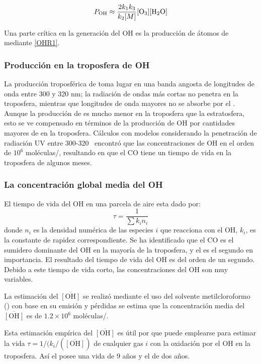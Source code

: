 \begin{equation}
P_\mathrm{OH} \approx  \frac{2k_1k_3}{ k_2[M] } [\ce{O3}]  [\ce{H2O}] 
\end{equation}

Una parte crítica en la generación del OH es la producción de átomos de    mediante \ref{OHR1}. 

\subsubsection{Producci\'on en la troposfera de OH}
La producción troposférica de  toma lugar en una  banda angosta de longitudes de onda entre 300 y 320 nm; la radiación de ondas más cortas no penetra en la troposfera, mientras que longitudes de onda mayores no se absorbe por el . Aunque la producción de  es mucho menor en la troposfera que la estratosfera, esto se ve compensado en términos de la producción de OH por cantidades mayores de  en la troposfera. Cálculos con modelos considerando la penetración de radiación UV entre 300-320 \nano\metre\,  encontró que las concentraciones de OH en el orden de $10^6$ moléculas/\cubic\metre, resultando en que el CO tiene un tiempo de vida en la troposfera de algunos meses.
\subsubsection{La concentraci\'on global media del OH}
El tiempo de vida del OH en una parcela de aire esta dado por:
\begin{equation*}
\tau=\frac{1}{\sum k_in_i}
\end{equation*}
donde $n_i$ es la densidad numérica de las especies $i$ que reacciona con el OH, $k_i$, es la constante de rapidez  correspondiente. Se ha identificado que el CO es el sumidero dominante del OH en la mayoría de la troposfera, y el  es el segundo en importancia. El resultado del tiempo de vida del OH es del orden de un segundo. Debido a este tiempo de vida corto, las concentraciones del OH son muy variables.

La estimación del  $\overline{[\mathrm{OH}]}$ se realizó mediante el uso del solvente metilcloroformo () con base en su emisión y pérdidas se estima que la concentración media del  $\overline{[\mathrm{OH}]}$ es de $1.2\times10^6$ moléculas/\centi\cubic\metre.

Esta estimación empírica del   $\overline{[\mathrm{OH}]}$ es útil por que puede emplearse para estimar la vida  $\tau=1/(k_i/(\overline{[\mathrm{OH}]})$ de cualquier gas $i$ con la oxidación por el OH en la troposfera. Así el  posee una vida de 9 años y el  de dos años.

